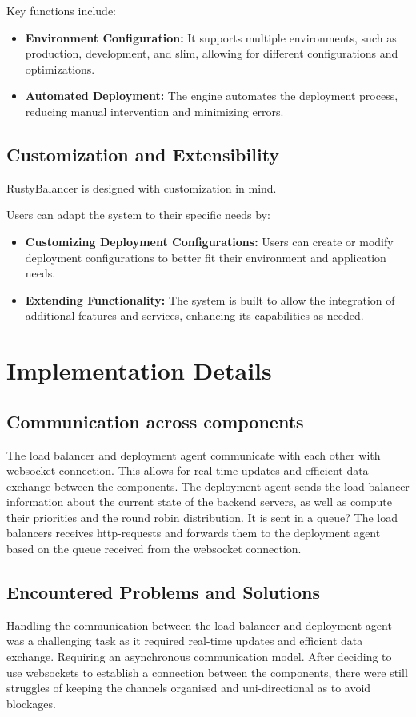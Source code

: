 \documentclass[twocolumn]{el-author}
\begin{document}
Key functions include:

\begin{itemize}
\item \textbf{Environment Configuration:} It supports multiple environments, such as production, development, and slim, allowing for different configurations and optimizations.
\item \textbf{Automated Deployment:} The engine automates the deployment process, reducing manual intervention and minimizing errors.
\end{itemize}

\subsection{Customization and Extensibility}
RustyBalancer is designed with customization in mind.

Users can adapt the system to their specific needs by:

\begin{itemize}
    \item \textbf{Customizing Deployment Configurations:} Users can create or modify deployment configurations to better fit their environment and application needs.
    \item \textbf{Extending Functionality:} The system is built to allow the integration of additional features and services, enhancing its capabilities as needed.
\end{itemize}

\section{Implementation Details}

\subsection{Communication across components}
The load balancer and deployment agent communicate with each other with websocket connection.
This allows for real-time updates and efficient data exchange between the components.
The deployment agent sends the load balancer information about the current state of the backend servers, as well as compute their priorities and the round robin distribution.
It is sent in a queue?
The load balancers receives http-requests and forwards them to the deployment agent based on the queue received from the websocket connection.

\subsection{Encountered Problems and Solutions}
Handling the communication between the load balancer and deployment agent was a challenging task as it required real-time updates and efficient data exchange.
Requiring an asynchronous communication model.
After deciding to use websockets to establish a connection between the components, there were still struggles of keeping the channels organised and uni-directional as to avoid blockages.
\end{document}
